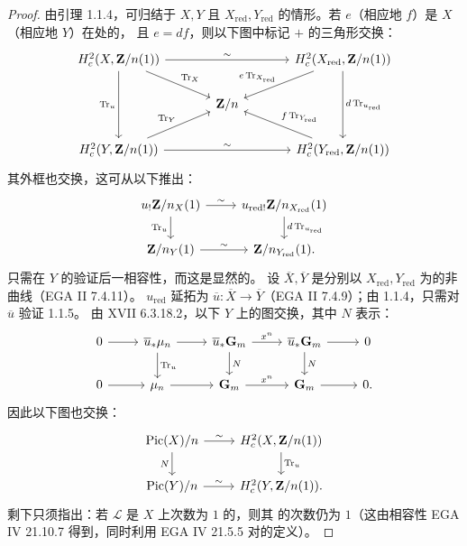 \begin{proof}
由引理 1.1.4，可归结于 $X,Y$ 且 $X_{\mathrm{red}},Y_{\mathrm{red}}$ 的情形。若 $e$（相应地 $f$）是 $X$（相应地 $Y$）在处的，
且 $e=df$，则以下图中标记 $+$ 的三角形交换：
\[\begin{tikzcd}[column sep=large]H_c^2(X,\mathbf Z/n(1))\ar[rr,"\sim"]\ar[dd,"\operatorname{Tr}_u"']\ar[dr,"\operatorname{Tr}_X"]&&H_c^2(X_{\mathrm{red}},\mathbf Z/n(1))\ar[dd,"{d\operatorname{Tr}_{u_{\mathrm{red}}}}"]\ar[dl,"{e\operatorname{Tr}_{X_{\mathrm{red}}}}"']\\&\mathbf Z/n&\\H_c^2(Y,\mathbf Z/n(1))\ar[rr,"\sim"]\ar[ur,"\operatorname{Tr}_Y"]&&H_c^2(Y_{\mathrm{red}},\mathbf Z/n(1))\ar[ul,"{f\operatorname{Tr}_{Y_{\mathrm{red}}}}"']\end{tikzcd}\]
其外框也交换，这可从以下推出：
\[\begin{tikzcd}u_!\mathbf Z/n_X(1)\ar[r,"\sim"]\ar[d,"\operatorname{Tr}_u"']&u_{\mathrm{red}!}\mathbf Z/n_{X_{\mathrm{red}}}(1)\ar[d,"{d\operatorname{Tr}_{u_{\mathrm{red}}}}"]\\\mathbf Z/n_Y(1)\ar[r,"\sim"]&\mathbf Z/n_{Y_{\mathrm{red}}}(1).\end{tikzcd}\]
只需在 $Y$ 的验证后一相容性，而这是显然的。
设 $\overline X,\overline Y$ 是分别以 $X_{\mathrm{red}},Y_{\mathrm{red}}$ 为的非曲线（EGA II 7.4.11）。 $u_{\mathrm{red}}$ 延拓为 $\overline u:\overline X\to\overline Y$（EGA II 7.4.9）；由 1.1.4，只需对 $\overline u$ 验证 1.1.5。
由 XVII 6.3.18.2，以下 $Y$ 上的图交换，其中 $N$ 表示：
\[\begin{tikzcd}0\ar[r]&\overline u_*\mu_n\ar[r]\ar[d,"\operatorname{Tr}_u"]&\overline u_*\mathbf G_m\ar[r,"{x^n}"]\ar[d,"N"]&\overline u_*\mathbf G_m\ar[r]\ar[d,"N"]&0\\0\ar[r]&\mu_n\ar[r]&\mathbf G_m\ar[r,"{x^n}"]&\mathbf G_m\ar[r]&0.\end{tikzcd}\]
因此以下图也交换：
\[\begin{tikzcd}\operatorname{Pic}(X)/n\ar[r,"\sim"]\ar[d,"N"']&H_c^2(X,\mathbf Z/n(1))\ar[d,"\operatorname{Tr}_u"]\\\operatorname{Pic}(Y)/n\ar[r,"\sim"]&H_c^2(Y,\mathbf Z/n(1)).\end{tikzcd}\]
剩下只须指出：若 $\mathscr L$ 是 $X$ 上次数为 $1$ 的，则其
的次数仍为 $1$（这由相容性 EGA IV 21.10.7 得到，同时利用 EGA IV 21.5.5 对的定义）。
\end{proof}
